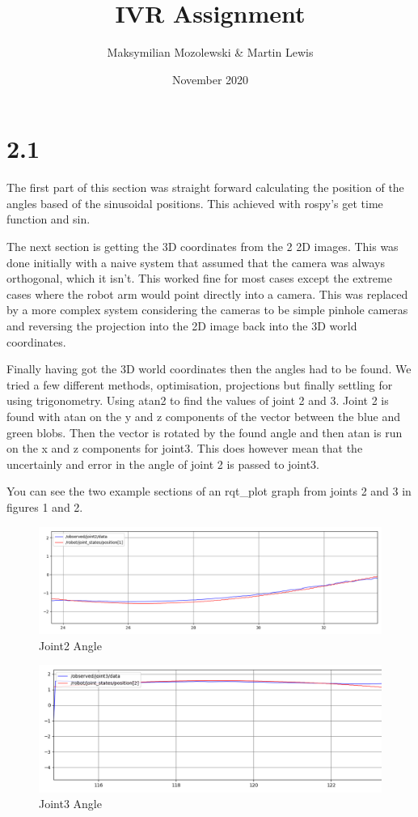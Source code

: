 \documentclass{report}
\title{IVR Assignment}
\author{Maksymilian Mozolewski \& Martin Lewis}
\date{November 2020}
\begin{document}
\maketitle

\section*{2.1}

The first part of this section was straight forward calculating the position of the angles based of the sinusoidal positions. This achieved with rospy's get time function and sin.

The next section is getting the 3D coordinates from the 2 2D images. This was done initially with a naive system that assumed that the camera was always orthogonal,
which it isn't. This worked fine for most cases except the extreme cases where the robot arm would point directly into a camera. This was replaced by a more complex
system considering the cameras to be simple pinhole cameras and reversing the projection into the 2D image back into the 3D world coordinates.

Finally having got the 3D world coordinates then the angles had to be found. We tried a few different methods, optimisation, projections but finally settling for using trigonometry. Using atan2 to find the values of
joint 2 and 3. Joint 2 is found with atan on the y and z components of the vector between the blue and green blobs. Then the vector is rotated by the found angle
and then atan is run on the x and z components for joint3. This does however mean that the uncertainly and error in the angle of joint 2 is passed to joint3.

You can see the two example sections of an rqt\_plot graph from joints 2 and 3 in figures 1 and 2.

\begin{figure}
    \includegraphics[width=\linewidth]{joint2.png}
    \caption{Joint2 Angle}
\end{figure}

\begin{figure}
    \includegraphics[width=\linewidth]{joint3.png}
    \caption{Joint3 Angle}
\end{figure}
\end{document}
